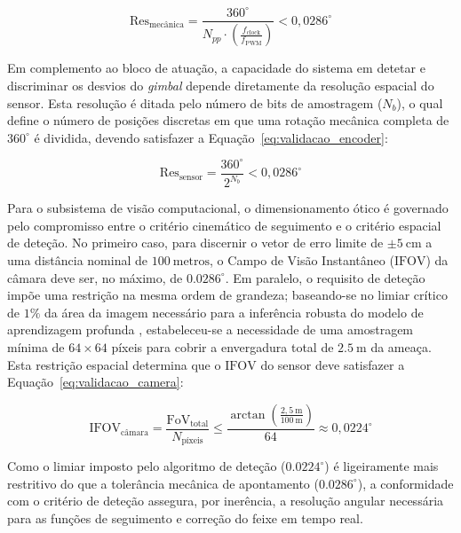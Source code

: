 \begin{equation}
    \text{Res}_{\text{mecânica}} = \frac{360^\circ}{N_{pp} \cdot \left( \frac{f_{\text{clock}}}{f_{\text{PWM}}} \right)} < 0{,}0286^\circ
    \label{eq:validacao_generica}
\end{equation}

Em complemento ao bloco de atuação, a capacidade do sistema em detetar e discriminar os desvios do \emph{gimbal} depende diretamente da resolução espacial do sensor. Esta resolução é ditada pelo número de bits de amostragem ($N_b$), o qual define o número de posições discretas em que uma rotação mecânica completa de $360^\circ$ é dividida, devendo satisfazer a Equação~\ref{eq:validacao_encoder}:

\begin{equation}
    \text{Res}_{\text{sensor}} = \frac{360^\circ}{2^{N_b}} < 0{,}0286^\circ
    \label{eq:validacao_encoder}
\end{equation}


Para o subsistema de visão computacional, o dimensionamento ótico é governado pelo compromisso entre o critério cinemático de seguimento e o critério espacial de deteção. No primeiro caso, para discernir o vetor de erro limite de $\pm 5~\text{cm}$ a uma distância nominal de $100~\text{metros}$, o Campo de Visão Instantâneo ($\text{IFOV}$) da câmara deve ser, no máximo, de $0.0286^\circ$. Em paralelo, o requisito de deteção impõe uma restrição na mesma ordem de grandeza; baseando-se no limiar crítico de $1\%$ da área da imagem necessário para a inferência robusta do modelo de aprendizagem profunda \parencite{tariq2025small}, estabeleceu-se a necessidade de uma amostragem mínima de $64\times64$ píxeis para cobrir a envergadura total de $2.5~\text{m}$ da ameaça. Esta restrição espacial determina que o $\text{IFOV}$ do sensor deve satisfazer a Equação~\ref{eq:validacao_camera}:

\begin{equation}
    \text{IFOV}_{\text{câmara}} = \frac{\text{FoV}_{\text{total}}}{N_{\text{píxeis}}} \le \frac{\arctan\left(\frac{2{,}5~\text{m}}{100~\text{m}}\right)}{64} \approx 0{,}0224^\circ
    \label{eq:validacao_camera}
\end{equation}

Como o limiar imposto pelo algoritmo de deteção ($0.0224^\circ$) é ligeiramente mais restritivo do que a tolerância mecânica de apontamento ($0.0286^\circ$), a conformidade com o critério de deteção assegura, por inerência, a resolução angular necessária para as funções de seguimento e correção do feixe em tempo real.

